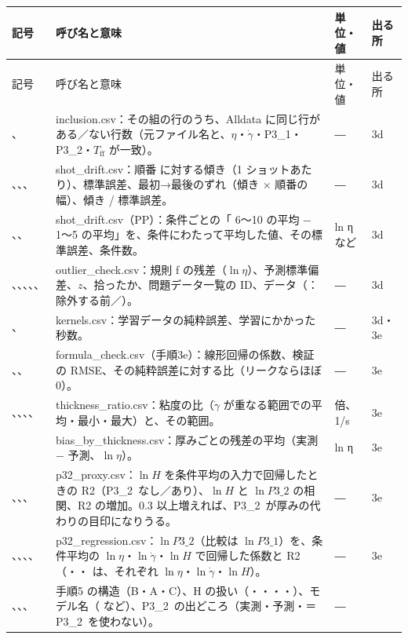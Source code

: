 \documentclass[paper=a4paper,fontsize=10.5pt,line_length=44zw,number_of_lines=38]{jlreq}
\makeatletter
\newcommand{\file}[1]{\texttt{\detokenize{#1}}}
\newcommand{\gd}{\dot{\gamma}}
\newcommand{\Tff}{T_{\mathrm{ff}}}
\newcommand{\PI}{P3\_1}
\newcommand{\PII}{P3\_2}
\newenvironment{symtab}{%
  \begin{longtable}{@{}>{\raggedright\arraybackslash}p{6.5\zw}>{\raggedright\arraybackslash}p{22\zw}>{\raggedright\arraybackslash}p{6\zw}>{\raggedright\arraybackslash}p{4.5\zw}@{}}
  \toprule 記号 & 呼び名と意味 & 単位・値 & 出る所 \\ \midrule \endfirsthead
  \toprule 記号 & 呼び名と意味 & 単位・値 & 出る所 \\ \midrule \endhead
  \bottomrule \endlastfoot}{\end{longtable}}
\makeatother
\begin{document}
\begin{symtab}
\file{n_in_alldata}、\file{n_not_in_alldata} & inclusion.csv：その組の行のうち、Alldata に同じ行がある／ない行数（元ファイル名と、$\eta$・$\gd$・\PI・\PII・$\Tff$ が一致）。 & ― & 3d \\
\file{slope_per_shot}、\file{se}、\file{drift_first_to_last}、\file{z} & shot\_drift.csv：順番 \file{pos} に対する傾き（1 ショットあたり）、標準誤差、最初→最後のずれ（傾き × 順番の幅）、傾き / 標準誤差。 & ― & 3d \\
\file{half_diff}、\file{half_diff_se}、\file{half_diff_n_cond} & shot\_drift.csv（PP）：条件ごとの「\file{pos} 6〜10 の平均 − \file{pos} 1〜5 の平均」を、条件にわたって平均した値、その標準誤差、条件数。 & ln η など & 3d \\
\file{resid}、\file{sd}、\file{z}、\file{flag}、\file{list_id}、\file{data} & outlier\_check.csv：規則 f の残差（$\ln\eta$）、予測標準偏差、$z$、拾ったか、問題データ一覧の ID、データ（\file{全条件}：除外する前／\file{除外後}）。 & ― & 3d \\
\file{pure_sd_ln_eta}、\file{fit_sec} & kernels.csv：学習データの純粋誤差、学習にかかった秒数。 & ― & 3d・3e \\
\file{coef_*}、\file{RMSE_test}、\file{RMSE_over_pure} & formula\_check.csv（手順3e）：線形回帰の係数、検証の RMSE、その純粋誤差に対する比（リークならほぼ 0）。 & ― & 3e \\
\file{ratio_mean}、\file{ratio_min}、\file{ratio_max}、\file{gd_lo}、\file{gd_hi} & thickness\_ratio.csv：粘度の比（$\gd$ が重なる範囲での平均・最小・最大）と、その範囲。 & 倍、1/s & 3e \\
\file{bias} & bias\_by\_thickness.csv：厚みごとの残差の平均（実測 $-$ 予測、$\ln\eta$）。 & ln η & 3e \\
\file{R2_lnH_base}、\file{R2_lnH_with_P32}、\file{corr_lnH_lnP32}、\file{gain} & p32\_proxy.csv：$\ln H$ を条件平均の入力で回帰したときの R2（\PII\ なし／あり）、$\ln H$ と $\ln\PII$ の相関、R2 の増加。0.3 以上増えれば、\PII\ が厚みの代わりの目印になりうる。 & ― & 3e \\
\file{regression}、\file{coef_le}、\file{coef_lg}、\file{coef_lH}、\file{R2} & p32\_regression.csv：$\ln\PII$（比較は $\ln\PI$）を、条件平均の $\ln\eta$・$\ln\gd$・$\ln H$ で回帰した係数と R2（\file{le}・\file{lg}・\file{lH} は、それぞれ $\ln\eta$・$\ln\gd$・$\ln H$）。 & ― & 3e \\
\file{struct}、\file{hv}、\file{model}、\file{psrc} & 手順5 の構造（B・A・C）、H の扱い（\file{1}・\file{2}・\file{4}・\file{14}・\file{24}）、モデル名（\file{B_1} など）、\PII\ の出どころ（実測・予測・\file{―}＝\PII\ を使わない）。 & ― & 5 \\

\end{symtab}
\end{document}
